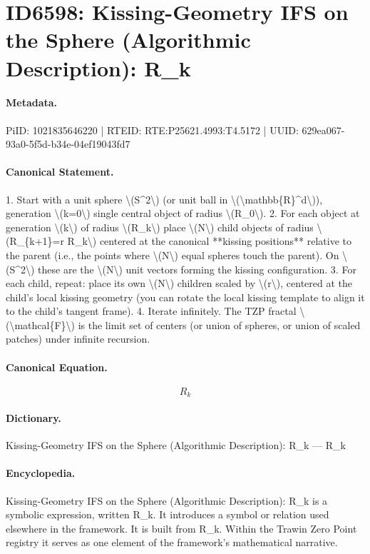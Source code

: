\section*{ID6598: Kissing-Geometry IFS on the Sphere (Algorithmic Description): R\_k}
\paragraph{Metadata.}
PiID: 1021835646220 | RTEID: RTE:P25621.4993:T4.5172 | UUID: 629ea067-93a0-5f5d-b34e-04ef19043fd7

\paragraph{Canonical Statement.}
1. Start with a unit sphere \textbackslash{}(S\textasciicircum{}2\textbackslash{}) (or unit ball in \textbackslash{}(\textbackslash{}mathbb\{R\}\textasciicircum{}d\textbackslash{})), generation \textbackslash{}(k=0\textbackslash{}) single central object of radius \textbackslash{}(R\_0\textbackslash{}). 2. For each object at generation \textbackslash{}(k\textbackslash{}) of radius \textbackslash{}(R\_k\textbackslash{}) place \textbackslash{}(N\textbackslash{}) child objects of radius \textbackslash{}(R\_\{k+1\}=r R\_k\textbackslash{}) centered at the canonical **kissing positions** relative to the parent (i.e., the points where \textbackslash{}(N\textbackslash{}) equal spheres touch the parent). On \textbackslash{}(S\textasciicircum{}2\textbackslash{}) these are the \textbackslash{}(N\textbackslash{}) unit vectors forming the kissing configuration. 3. For each child, repeat: place its own \textbackslash{}(N\textbackslash{}) children scaled by \textbackslash{}(r\textbackslash{}), centered at the child’s local kissing geometry (you can rotate the local kissing template to align it to the child’s tangent frame). 4. Iterate infinitely. The TZP fractal \textbackslash{}(\textbackslash{}mathcal\{F\}\textbackslash{}) is the limit set of centers (or union of spheres, or union of scaled patches) under infinite recursion.

\paragraph{Canonical Equation.}
\[
R_k
\]

\paragraph{Dictionary.}
Kissing-Geometry IFS on the Sphere (Algorithmic Description): R\_k — R\_k

\paragraph{Encyclopedia.}
Kissing-Geometry IFS on the Sphere (Algorithmic Description): R\_k is a symbolic expression, written R\_k. It introduces a symbol or relation used elsewhere in the framework. It is built from R\_k. Within the Trawin Zero Point registry it serves as one element of the framework's mathematical narrative.

